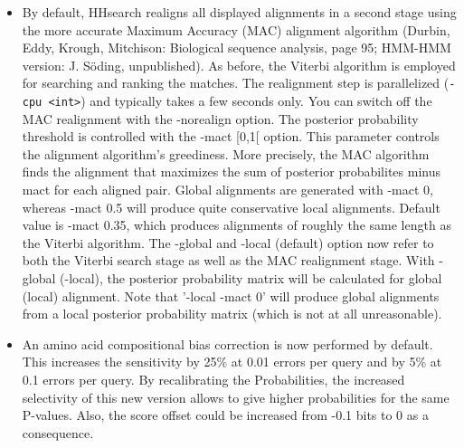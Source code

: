 \documentclass[11pt,a4paper]{article}
\begin{document}
\begin{itemize}
\item{By default, HHsearch realigns all displayed alignments in a second stage 
  using the more accurate Maximum Accuracy (MAC) alignment algorithm 
  (Durbin, Eddy, Krough, Mitchison: Biological sequence analysis, page 95;
  HMM-HMM version: J. S\"oding, unpublished). As before, the Viterbi algorithm 
  is employed for searching and ranking the matches. The realignment step is 
  parallelized (\verb`-cpu <int>`) and typically takes a few seconds only. You can 
  switch off the MAC realignment with the -norealign option. 
     The posterior probability threshold is controlled with the -mact [0,1[ 
  option. This parameter controls the alignment algorithm's greediness. More 
  precisely, the MAC algorithm finds the alignment that maximizes the sum of 
  posterior probabilites minus mact for each aligned pair. Global alignments 
  are generated with -mact 0, whereas -mact 0.5 will produce quite conservative
  local alignments. Default value is -mact 0.35, which produces alignments of
  roughly the same length as the Viterbi algorithm. 
     The -global and -local (default) option now refer to both the Viterbi search 
  stage as well as the MAC realignment stage. With -global (-local), the 
  posterior probability matrix will be calculated for global (local) 
  alignment. Note that '-local -mact 0' will produce global alignments from
  a local posterior probability matrix (which is not at all unreasonable).
}
\item{An amino acid compositional bias correction is now performed by default.
  This increases the sensitivity by 25\% at 0.01 errors per query and by 5\% at 
  0.1 errors per query. By recalibrating the Probabilities, the increased 
  selectivity of this new version allows to give higher probabilities for the 
  same P-values. Also, the score offset could be increased from -0.1 bits to 0 
  as a consequence. 
}


\end{itemize}
\end{document}
